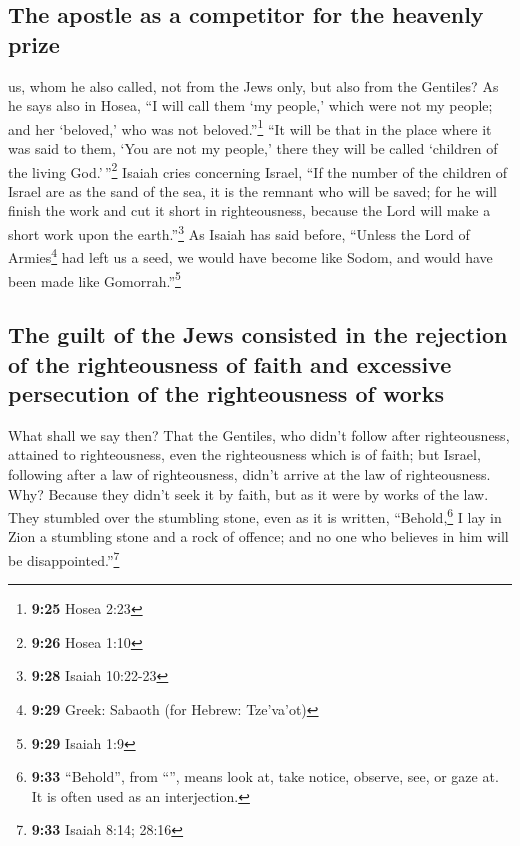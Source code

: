 \hypertarget{the-apostle-as-a-competitor-for-the-heavenly-prize}{%
\subsection{The apostle as a competitor for the heavenly
prize}\label{the-apostle-as-a-competitor-for-the-heavenly-prize}}

 us, whom he also called, not from the Jews only, but
also from the Gentiles?  As he says also in Hosea, ``I
will call them `my people,' which were not my people; and her `beloved,'
who was not beloved.''\footnote{\textbf{9:25} Hosea 2:23}
 ``It will be that in the place where it was said to
them, `You are not my people,' there they will be called `children of
the living God.'\,''\footnote{\textbf{9:26} Hosea 1:10} 
Isaiah cries concerning Israel, ``If the number of the children of
Israel are as the sand of the sea, it is the remnant who will be saved;
 for he will finish the work and cut it short in
righteousness, because the Lord will make a short work upon the
earth.''\footnote{\textbf{9:28} Isaiah 10:22-23}  As
Isaiah has said before, ``Unless the Lord of Armies\footnote{\textbf{9:29}
  Greek: Sabaoth (for Hebrew: Tze'va'ot)} had left us a seed, we would
have become like Sodom, and would have been made like
Gomorrah.''\footnote{\textbf{9:29} Isaiah 1:9}

\hypertarget{the-guilt-of-the-jews-consisted-in-the-rejection-of-the-righteousness-of-faith-and-excessive-persecution-of-the-righteousness-of-works}{%
\subsection{The guilt of the Jews consisted in the rejection of the
righteousness of faith and excessive persecution of the righteousness of
works}\label{the-guilt-of-the-jews-consisted-in-the-rejection-of-the-righteousness-of-faith-and-excessive-persecution-of-the-righteousness-of-works}}

 What shall we say then? That the Gentiles, who didn't
follow after righteousness, attained to righteousness, even the
righteousness which is of faith;  but Israel, following
after a law of righteousness, didn't arrive at the law of righteousness.
 Why? Because they didn't seek it by faith, but as it
were by works of the law. They stumbled over the stumbling stone,
 even as it is written, ``Behold,\footnote{\textbf{9:33}
  ``Behold'', from ``'', means look at, take notice,
  observe, see, or gaze at. It is often used as an interjection.} I lay
in Zion a stumbling stone and a rock of offence; and no one who believes
in him will be disappointed.''\footnote{\textbf{9:33} Isaiah 8:14; 28:16}

